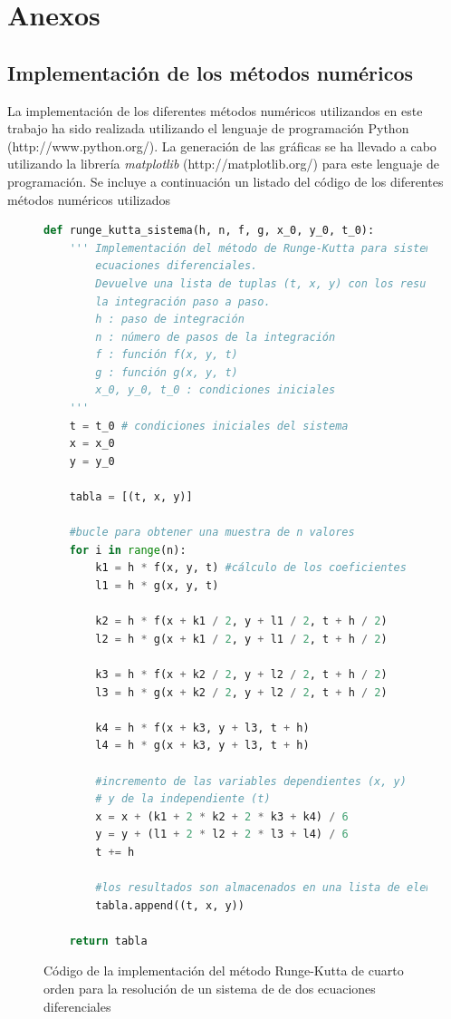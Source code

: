 \documentclass[11pt]{article}
\begin{document}
\section{Anexos}

\subsection{Implementación de los métodos numéricos}
La implementación de los diferentes métodos numéricos utilizandos en este trabajo ha sido realizada utilizando el lenguaje de programación Python (http://www.python.org/). La generación de las gráficas se ha llevado a cabo utilizando la librería \textit{matplotlib} (http://matplotlib.org/) para este lenguaje de programación. Se incluye a continuación un listado del código de los diferentes métodos numéricos utilizados

\begin{figure}
\begin{lstlisting}[language=Python]
def runge_kutta_sistema(h, n, f, g, x_0, y_0, t_0):
	''' Implementación del método de Runge-Kutta para sistemas de dos
		ecuaciones diferenciales.
		Devuelve una lista de tuplas (t, x, y) con los resultados de
		la integración paso a paso.
		h : paso de integración
		n : número de pasos de la integración
		f : función f(x, y, t)
		g : función g(x, y, t)
		x_0, y_0, t_0 : condiciones iniciales
 	'''
	t = t_0 # condiciones iniciales del sistema
	x = x_0
	y = y_0

	tabla = [(t, x, y)]

	#bucle para obtener una muestra de n valores
	for i in range(n):
		k1 = h * f(x, y, t) #cálculo de los coeficientes
		l1 = h * g(x, y, t)

		k2 = h * f(x + k1 / 2, y + l1 / 2, t + h / 2)
		l2 = h * g(x + k1 / 2, y + l1 / 2, t + h / 2)

		k3 = h * f(x + k2 / 2, y + l2 / 2, t + h / 2)
		l3 = h * g(x + k2 / 2, y + l2 / 2, t + h / 2)

		k4 = h * f(x + k3, y + l3, t + h)
		l4 = h * g(x + k3, y + l3, t + h)

		#incremento de las variables dependientes (x, y)
		# y de la independiente (t)
		x = x + (k1 + 2 * k2 + 2 * k3 + k4) / 6
		y = y + (l1 + 2 * l2 + 2 * l3 + l4) / 6
		t += h

		#los resultados son almacenados en una lista de elementos (t, x, y)
		tabla.append((t, x, y))

	return tabla
\end{lstlisting}
\caption{Código de la implementación del método Runge-Kutta de cuarto orden para la resolución de un sistema de de dos ecuaciones diferenciales}
\label{runge_kutta_code}
\end{figure}
\end{document}
